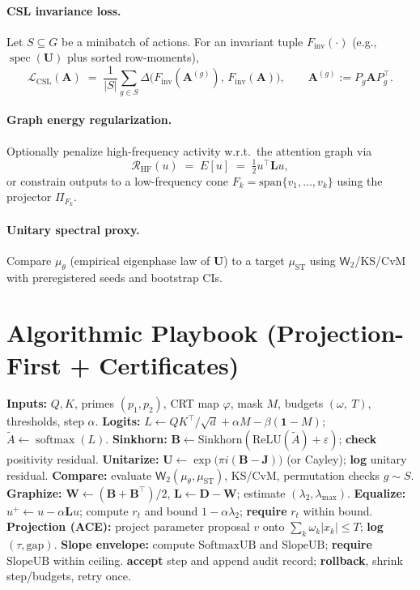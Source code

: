 \documentclass[11pt]{article}
\newcommand{\one}{\mathbf{1}}
\newcommand{\softmax}{\operatorname{softmax}}
\newcommand{\W}{\mathsf{W}}
\newcommand{\bJ}{\mathbf{J}}
\newcommand{\bA}{\mathbf{A}}
\newcommand{\bB}{\mathbf{B}}
\newcommand{\bU}{\mathbf{U}}
\newcommand{\bL}{\mathbf{L}}
\newcommand{\bD}{\mathbf{D}}
\newcommand{\bW}{\mathbf{W}}
\newcommand{\spec}{\operatorname{spec}}
\begin{document}
\paragraph{CSL invariance loss.}
Let $S\subseteq G$ be a minibatch of actions. For an invariant tuple $F_{\mathrm{inv}}(\cdot)$ (e.g., $\spec(\bU)$ plus sorted row-moments),
\[
\mathcal{L}_{\mathrm{CSL}}(\bA) \;=\; \frac{1}{|S|}\sum_{g\in S} \Delta\big(F_{\mathrm{inv}}(\bA^{(g)}),\,F_{\mathrm{inv}}(\bA)\big),\qquad \bA^{(g)}:=P_g \bA P_g^\top.
\]

\paragraph{Graph energy regularization.}
Optionally penalize high-frequency activity w.r.t.\ the attention graph via
\[
\mathcal{R}_{\mathrm{HF}}(u) \;=\; E[u] \;=\; \tfrac12 u^\top \bL u,
\]
or constrain outputs to a low-frequency cone $F_k=\mathrm{span}\{v_1,\dots,v_k\}$ using the projector $\Pi_{F_k}$.

\paragraph{Unitary spectral proxy.}
Compare $\mu_\theta$ (empirical eigenphase law of $\bU$) to a target $\mu_{\mathrm{ST}}$ using $\W_2$/KS/CvM with preregistered seeds and bootstrap CIs.

\section{Algorithmic Playbook (Projection-First + Certificates)}
\begin{algorithm}[H]
\caption{AU--Triad $\oplus$ Automorphic Learning (one certified step)}
\begin{algorithmic}[1]
\State \textbf{Inputs:} $Q,K$, primes $(p_1,p_2)$, CRT map $\varphi$, mask $M$, budgets $(\omega,\ T)$, thresholds, step $\alpha$.
\State \textbf{Logits:} $L \gets QK^\top/\sqrt d + \alpha M - \beta(\one-M)$; $\tilde A \gets \softmax(L)$.
\State \textbf{Sinkhorn:} $\bB\gets \mathrm{Sinkhorn}(\mathrm{ReLU}(\tilde A)+\varepsilon)$; \textbf{check} positivity residual.
\State \textbf{Unitarize:} $\bU\gets \exp\big(\pi i(\bB-\bJ)\big)$ (or Cayley); \textbf{log} unitary residual.
\State \textbf{Compare:} evaluate $\W_2(\mu_\theta,\mu_{\mathrm{ST}})$, KS/CvM, permutation checks $g\sim S$.
\State \textbf{Graphize:} $\bW\gets (\bB+\bB^\top)/2$, $\bL\gets \bD-\bW$; estimate $(\lambda_2,\lambda_{\max})$.
\State \textbf{Equalize:} $u^+\gets u-\alpha \bL u$; compute $r_t$ and bound $1-\alpha\lambda_2$; \textbf{require} $r_t$ within bound.
\State \textbf{Projection (ACE):} project parameter proposal $v$ onto $\sum_k \omega_k|x_k|\le T$; \textbf{log} $(\tau,\text{gap})$.
\State \textbf{Slope envelope:} compute $\mathrm{SoftmaxUB}$ and $\mathrm{SlopeUB}$; \textbf{require} $\mathrm{SlopeUB}$ within ceiling.
 \State \textbf{accept} step and append audit record; \Else \State \textbf{rollback}, shrink step/budgets, retry once. \EndIf
\end{algorithmic}
\end{algorithm}
\end{document}
